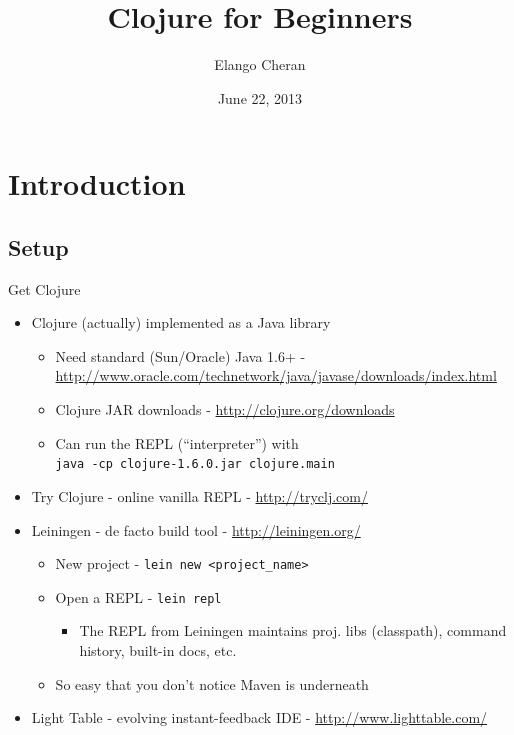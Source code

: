 \documentclass{beamer}
\author{Elango Cheran}
\title{Clojure for Beginners}
\date{June 22, 2013}
\begin{document}
\begin{frame}[plain] 
  \titlepage
\end{frame}

\section{Introduction}

\subsection{Setup}

\begin{frame}[allowframebreaks]{Get Clojure}
  \begin{itemize}
  \item Clojure (actually) implemented as a Java library
    \begin{itemize} 
    \item Need standard (Sun/Oracle) Java 1.6+ - \url{http://www.oracle.com/technetwork/java/javase/downloads/index.html}
    \item Clojure JAR downloads - \url{http://clojure.org/downloads}
    \item Can run the REPL (``interpreter'') with\\
\texttt{java -cp clojure-1.6.0.jar clojure.main}
    \end{itemize}
  \item Try Clojure - online vanilla REPL - \url{http://tryclj.com/}
    \framebreak
  \item Leiningen - de facto build tool - \url{http://leiningen.org/}
    \begin{itemize}
    \item New project - \texttt{lein new <project\_name>}
    \item Open a REPL - \texttt{lein repl}
      \begin{itemize}
      \item  The REPL from Leiningen maintains proj. libs (classpath), command
        history, built-in docs, etc.
      \end{itemize}
    \item So easy that you don't notice Maven is underneath
    \end{itemize}
  \item Light Table - evolving instant-feedback IDE - \url{http://www.lighttable.com/}
  \end{itemize}
\end{frame}
\end{document}
